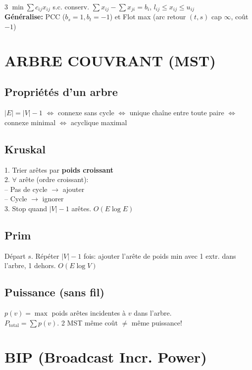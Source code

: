 \documentclass[a4paper,4pt]{article}
\begin{document}
\begin{multicols}{3}
$\min\sum c_{ij}x_{ij}$ s.c. conserv. $\sum x_{ij}-\sum x_{ji}=b_i$, $l_{ij}\leq x_{ij}\leq u_{ij}$\\
\textbf{G\'en\'eralise:} PCC ($b_s=1,b_t=-1$) et Flot max (arc retour $(t,s)$ cap $\infty$, co\^ut $-1$)

\section{ARBRE COUVRANT (MST)}

\subsection{Propri\'et\'es d'un arbre}
{\color{red}$|E|=|V|-1$} $\Leftrightarrow$ connexe sans cycle $\Leftrightarrow$ unique cha\^ine entre toute paire $\Leftrightarrow$ connexe minimal $\Leftrightarrow$ acyclique maximal

\subsection{Kruskal}
1. Trier ar\^etes par \textbf{poids croissant}\\
2. $\forall$ ar\^ete (ordre croissant):\\
\hspace{4pt}-- Pas de cycle $\to$ ajouter\\
\hspace{4pt}-- Cycle $\to$ ignorer\\
3. Stop quand $|V|-1$ ar\^etes. $O(E\log E)$

\subsection{Prim}
D\'epart $s$. R\'ep\'eter $|V|-1$ fois: ajouter l'ar\^ete de poids min avec 1 extr. dans l'arbre, 1 dehors. $O(E\log V)$

\subsection{Puissance (sans fil)}
$p(v)=\max$ poids ar\^etes incidentes \`a $v$ dans l'arbre.\\
$P_{\text{total}}=\sum p(v)$. 2 MST m\^eme co\^ut $\neq$ m\^eme puissance!

\section{BIP (Broadcast Incr. Power)}


\end{multicols}
\end{document}
